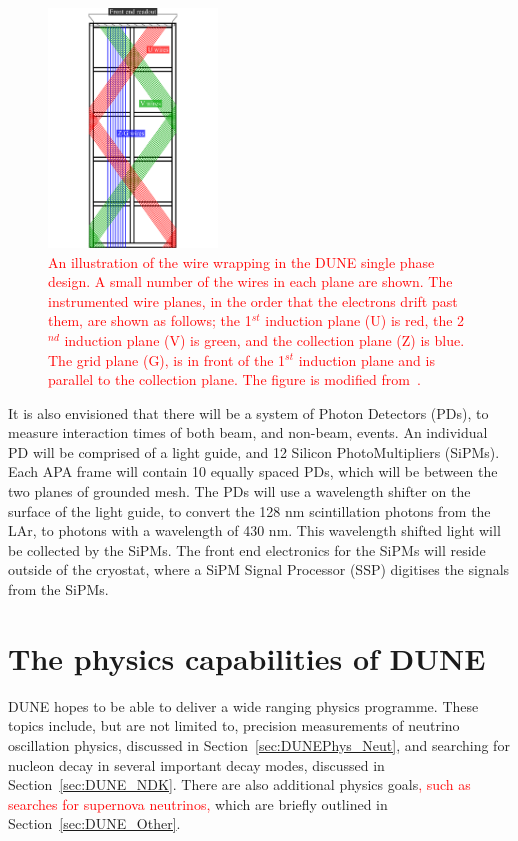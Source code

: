 \begin{figure}
  \centering
  \includegraphics[width=0.4\textwidth]{tpc_apa_cross_sections}
  \caption[An illustration of the wire wrapping in the DUNE single phase design]
          {\textcolor{red}{An illustration of the wire wrapping in the DUNE single phase design. A small number of the wires in each plane are shown. The instrumented wire planes, in the order that the electrons drift past them, are shown as follows; the 1$^{st}$ induction plane (U) is red, the 2$^{nd}$ induction plane (V) is green, and the collection plane (Z) is blue. The grid plane (G), is in front of the 1$^{st}$ induction plane and is parallel to the collection plane. The figure is modified from~\citep{DUNECDR_V4}.}}
  \label{fig:FDWireWrap}
\end{figure}

It is also envisioned that there will be a system of Photon Detectors (PDs), to measure interaction times of both beam, and non-beam, events. An individual PD will be comprised of a light guide, and 12 Silicon PhotoMultipliers (SiPMs). Each APA frame will contain 10 equally spaced PDs, which will be between the two planes of grounded mesh. The PDs will use a wavelength shifter on the surface of the light guide, to convert the 128 nm scintillation photons from the LAr, to photons with a wavelength of 430 nm. This wavelength shifted light will be collected by the SiPMs. The front end electronics for the SiPMs will reside outside of the cryostat, where a SiPM Signal Processor (SSP) digitises the signals from the SiPMs. \\

\section{The physics capabilities of DUNE} \label{sec:DUNEPhys}%
DUNE hopes to be able to deliver a wide ranging physics programme. These topics include, but are not limited to, precision measurements of neutrino oscillation physics, discussed in Section~\ref{sec:DUNEPhys_Neut}, and searching for nucleon decay in several important decay modes, discussed in Section~\ref{sec:DUNE_NDK}. There are also additional physics goals\textcolor{red}{, such as searches for supernova neutrinos,} which are briefly outlined in Section~\ref{sec:DUNE_Other}. \\

